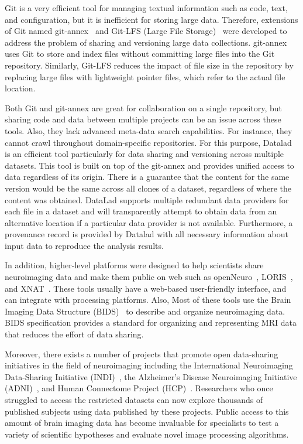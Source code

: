 Git is a very efficient tool for managing textual information such as 
code, text, and configuration, but it is inefficient for storing large 
data. Therefore, extensions of Git named git-annex~\cite{git-annex} 
and Git-LFS (Large File Storage)~\cite{git-lfs} were developed to 
address the problem of sharing and versioning large data collections. 
git-annex uses Git to store and index files without committing large 
files into the Git repository. Similarly, Git-LFS reduces the impact of 
file size in the repository by replacing large files with lightweight 
pointer files, which refer to the actual file location. 

Both Git and git-annex are great for collaboration on a single 
repository, but sharing code and data between multiple projects can be an 
issue across these tools. Also, they lack advanced meta-data search 
capabilities. For instance, they cannot crawl throughout domain-specific repositories.
 For this purpose, Datalad~\cite{datalad} is an 
efficient tool particularly for data sharing and versioning across 
multiple datasets. This tool is built on top of the git-annex and provides 
unified access to data regardless of its origin. There is a guarantee 
that the content for the same version would be the same across all 
clones of a dataset, regardless of where the content was obtained. 
DataLad supports multiple redundant data providers for each file in a 
dataset and will transparently attempt to obtain data from an 
alternative location if a particular data provider is not available. 
Furthermore, a provenance record is provided by Datalad with all 
necessary information about input data to reproduce the analysis 
results. 

In addition, higher-level platforms were designed to help 
scientists share neuroimaging data and make them public on web such as 
openNeuro~\cite{gorgolewski2017openneuro}, LORIS~\cite{das2012loris}, 
and XNAT~\cite{marcus2007extensible}. 
These tools usually have a web-based user-friendly interface, and can 
integrate with processing platforms. Also, Most of these tools use the 
Brain Imaging Data Structure (BIDS)~\cite{gorgolewski2016brain} to 
describe and organize neuroimaging data. BIDS specification provides a 
standard for organizing and representing MRI data that reduces the 
effort of data sharing. 

Moreover, there exists a number of projects that promote open 
data-sharing initiatives in the field of neuroimaging including the 
International Neuroimaging Data-Sharing Initiative 
(INDI)~\cite{mennes2013making, milham2012open}, the Alzheimer’s Disease 
Neuroimaging Initiative (ADNI)~\cite{jack2008alzheimer}, and Human 
Connectome Project (HCP)~\cite{van2012human}. Researchers who once struggled
to access the restricted datasets can now explore thousands of published subjects
using data published by these projects.
Public access to this amount of brain imaging data has become 
invaluable for specialists to test a variety of scientific hypotheses 
and evaluate novel image processing algorithms. 


